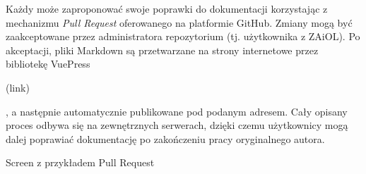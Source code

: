 Każdy może zaproponować swoje poprawki do dokumentacji korzystając z mechanizmu \emph{Pull Request} oferowanego na platformie GitHub. Zmiany mogą być zaakceptowane przez administratora repozytorium (tj. użytkownika z ZAiOL). Po akceptacji, pliki Markdown są przetwarzane na strony internetowe przez bibliotekę VuePress \begin{todo}(link)\end{todo}, a następnie automatycznie publikowane pod podanym adresem. Cały opisany proces odbywa się na zewnętrznych serwerach, dzięki czemu użytkownicy mogą dalej poprawiać dokumentację po zakończeniu pracy oryginalnego autora.
\begin{todo}
    Screen z przykładem Pull Request
\end{todo}
